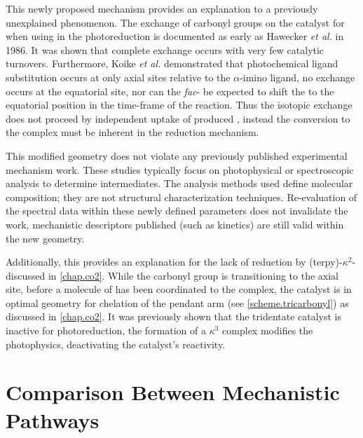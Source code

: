 This newly proposed mechanism provides an explanation to a previously unexplained phenomenon. The exchange of carbonyl groups on the catalyst for  when using  in the photoreduction is documented as early as Hawecker \textit{et al.} in 1986\autocite{hawecker1986}. It was shown that complete exchange occurs with very few catalytic turnovers. Furthermore, Koike \textit{et al.} demonstrated that photochemical ligand substitution occurs at only axial sites relative to the $\alpha$-imino ligand\autocite{koike2002}, no exchange occurs at the equatorial site, nor can the \textit{fac}- be expected to shift the  to the equatorial position in the time-frame of the reaction. Thus the isotopic exchange does not proceed by independent uptake of produced , instead the conversion to the  complex must be inherent in the reduction mechanism. 

This modified geometry does not violate any previously published experimental mechanism work. These studies typically focus on photophysical or spectroscopic analysis to determine intermediates. The analysis methods used define molecular composition; they are not structural characterization techniques. Re-evaluation of the spectral data within these newly defined parameters does not invalidate the work, mechanistic descriptors published (such as kinetics) are still valid within the new geometry.

Additionally, this provides an explanation for the lack of  reduction by (terpy)-$\kappa^2$- discussed in \autoref{chap.co2}. While the carbonyl group is transitioning to the axial site, before a molecule of  has been coordinated to the complex, the catalyst is in optimal geometry for chelation of the pendant arm (see \autoref{scheme.tricarbonyl}) as discussed in \autoref{chap.co2}. It was previously shown that the tridentate catalyst is inactive for  photoreduction, the formation of a $\kappa^3$ complex modifies the photophysics, deactivating the catalyst's reactivity.

\FloatBarrier

\section{Comparison Between Mechanistic Pathways} \label{sec.compare}

